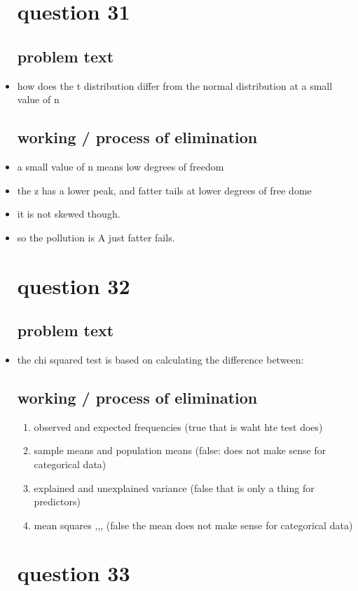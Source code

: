 \documentclass{article}
\begin{document}
\begin{itemize}
\section{question 31}
\subsection{problem text}
\item how does the t distribution differ from the normal distribution at a small value of n 
\subsection{working / process of elimination }
\item a small value of n means low degrees of freedom 
\item the z has a lower peak, and fatter tails at lower degrees of free dome
\item it is not skewed though. 
\item so the pollution is A just fatter fails. 



\section{question 32}
\subsection{problem text}
\item the chi squared test is based on calculating the difference between: 
\subsection{working / process of elimination }
\begin{enumerate}
    \item observed and expected frequencies (true that is waht hte test does)
    \item sample means and population means (false: does not make sense for categorical data)
    \item explained and unexplained variance (false that is only a thing for predictors) 
    \item mean squares ,,, (false the mean does not make sense for categorical data) 
\end{enumerate}
\section{question 33}

\end{itemize}
\end{document}
